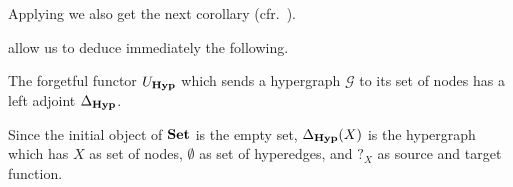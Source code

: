 \documentclass[3p]{elsarticle}
\newcommand{\catname}[1]{\textbf{\textup{#1}}}
\newcommand{\hyp}{\catname{Hyp}}
\theoremstyle{remark}
\theoremstyle{definition}
\begin{document}
Applying  we also get the next corollary (cfr.~\cite[Fact 4.17]{ehrig2006fundamentals}).


 allow us to deduce immediately the following.

\begin{prop}\label{cor:left}  The forgetful functor $U_{\hyp}$ which sends a hypergraph $\mathcal{G}$ to its set of nodes has a left adjoint $\Delta_{\hyp}$.
\end{prop}

\begin{exa}Since the initial object of $\catname{Set}$ is the empty set,  $\Delta_{\hyp}(X)$ is the hypergraph which has $X$ as set of nodes, $\emptyset$ as set of hyperedges, and $?_X$ as source and target function.
\end{exa}

\end{document}
